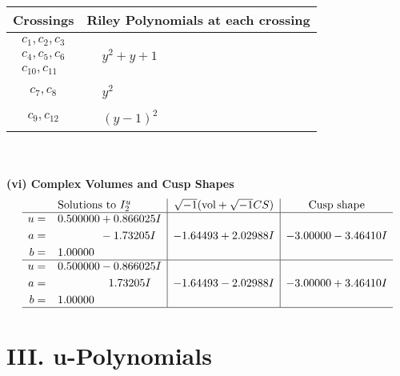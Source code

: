 \documentclass[1p]{elsarticle_modified}
\theoremstyle{definition}
\newcommand{\I}{\sqrt{-1}}
\begin{document}
\begin{tabular}{m{50pt}|m{274pt}}
Crossings & \hspace{64pt}Riley Polynomials at each crossing \\
\hline $$\begin{aligned}c_{1},c_{2},c_{3}\\c_{4},c_{5},c_{6}\\c_{10},c_{11}\end{aligned}$$&$\begin{aligned}
&y^2+y+1
\end{aligned}$\\
\hline $$\begin{aligned}c_{7},c_{8}\end{aligned}$$&$\begin{aligned}
&y^2
\end{aligned}$\\
\hline $$\begin{aligned}c_{9},c_{12}\end{aligned}$$&$\begin{aligned}
&(y-1)^2
\end{aligned}$\\
\hline
\end{tabular}\\~\\
\newpage\flushleft \textbf{(vi) Complex Volumes and Cusp Shapes}
$$\begin{array}{c|c|c}  
\text{Solutions to }I^u_{2}& \I (\text{vol} + \sqrt{-1}CS) & \text{Cusp shape}\\
 \hline 
\begin{aligned}
u &= \phantom{-}0.500000 + 0.866025 I \\
a &= \phantom{-0.000000 } -1.73205 I \\
b &= \phantom{-}1.00000\phantom{ +0.000000I}\end{aligned}
 & -1.64493 + 2.02988 I & -3.00000 - 3.46410 I \\ \hline\begin{aligned}
u &= \phantom{-}0.500000 - 0.866025 I \\
a &= \phantom{-0.000000 -}1.73205 I \\
b &= \phantom{-}1.00000\phantom{ +0.000000I}\end{aligned}
 & -1.64493 - 2.02988 I & -3.00000 + 3.46410 I\\
 \hline 
 \end{array}$$\newpage
\newpage\renewcommand{\arraystretch}{1}
\centering \section*{ III. u-Polynomials}
\end{document}
